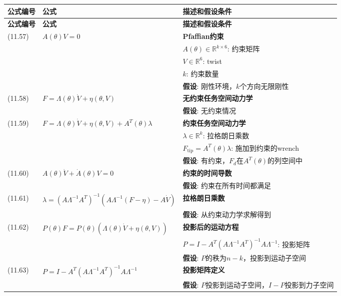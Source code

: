 \documentclass[12pt,a4paper]{article}
\begin{document}
\begin{longtable}{|p{}|p{}|p{}|}
\hline
\textbf{公式编号} & \textbf{公式} & \textbf{描述和假设条件} \\
\hline
\endfirsthead
\hline
\textbf{公式编号} & \textbf{公式} & \textbf{描述和假设条件} \\
\hline
\endhead
\hline
\endfoot
\hline
\endlastfoot

(11.57) & $A(\theta)V = 0$ & 
\textbf{Pfaffian约束} \\
& & $A(\theta) \in \mathbb{R}^{k \times 6}$: 约束矩阵 \\
& & $V \in \mathbb{R}^6$: twist \\
& & $k$: 约束数量 \\
& & \textbf{假设}: 刚性环境，$k$个方向无限刚性 \\
\hline

(11.58) & $F = \Lambda(\theta)\dot{V} + \eta(\theta, V)$ & 
\textbf{无约束任务空间动力学} \\
& & \textbf{假设}: 无约束情况 \\
\hline

(11.59) & $F = \Lambda(\theta)\dot{V} + \eta(\theta, V) + A^T(\theta)\lambda$ & 
\textbf{约束任务空间动力学} \\
& & $\lambda \in \mathbb{R}^k$: 拉格朗日乘数 \\
& & $F_{\text{tip}} = A^T(\theta)\lambda$: 施加到约束的wrench \\
& & \textbf{假设}: 有约束，$F_d$在$A^T(\theta)$的列空间中 \\
\hline

(11.60) & $A(\theta)\dot{V} + \dot{A}(\theta)V = 0$ & 
\textbf{约束的时间导数} \\
& & \textbf{假设}: 约束在所有时间都满足 \\
\hline

(11.61) & $\lambda = (A\Lambda^{-1}A^T)^{-1}(A\Lambda^{-1}(F - \eta) - A\dot{V})$ & 
\textbf{拉格朗日乘数} \\
& & \textbf{假设}: 从约束动力学求解得到 \\
\hline

(11.62) & $P(\theta)F = P(\theta)(\Lambda(\theta)\dot{V} + \eta(\theta, V))$ & 
\textbf{投影后的运动方程} \\
& & $P = I - A^T(A\Lambda^{-1}A^T)^{-1}A\Lambda^{-1}$: 投影矩阵 \\
& & \textbf{假设}: $P$的秩为$n-k$，投影到运动子空间 \\
\hline

(11.63) & $P = I - A^T(A\Lambda^{-1}A^T)^{-1}A\Lambda^{-1}$ & 
\textbf{投影矩阵定义} \\
& & \textbf{假设}: $P$投影到运动子空间，$I-P$投影到力子空间 \\
\hline


\end{longtable}
\end{document}
